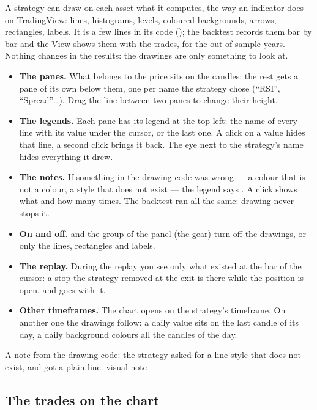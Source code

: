 A strategy can draw on each asset what it computes, the way an indicator does
on TradingView: lines, histograms, levels, coloured backgrounds, arrows,
rectangles, labels. It is a few lines in its code
(); the backtest records them bar by bar and the View
shows them with the trades, for the out-of-sample years. Nothing changes in
the results: the drawings are only something to look at.

\begin{itemize}
  \item \textbf{The panes.} What belongs to the price sits on the candles;
    the rest gets a pane of its own below them, one per name the strategy
    chose (\enquote{RSI}, \enquote{Spread}\ldots). Drag the line between two
    panes to change their height.
  \item \textbf{The legends.} Each pane has its legend at the top left: the
    name of every line with its value under the cursor, or the last one. A
    click on a value hides that line, a second click brings it back. The eye
    next to the strategy's name hides everything it drew.
  \item \textbf{The notes.} If something in the drawing code was wrong --- a
    colour that is not a colour, a style that does not exist --- the legend
    says . A click shows what and how many times. The backtest
    ran all the same: drawing never stops it.
  \item \textbf{On and off.} \freccia{} and the
     group of the panel (the gear) turn off the
    drawings, or only the lines, rectangles and labels.
  \item \textbf{The replay.} During the replay you see only what existed at
    the bar of the cursor: a stop the strategy removed at the exit is there
    while the position is open, and goes with it.
  \item \textbf{Other timeframes.} The chart opens on the strategy's
    timeframe. On another one the drawings follow: a daily value sits on the
    last candle of its day, a daily background colours all the candles of
    the day.
\end{itemize}

  {A note from the drawing code: the strategy asked for a line style that
   does not exist, and got a plain line.}
  {visual-note}

\subsection{The trades on the chart}\label{sez:view-trades}

